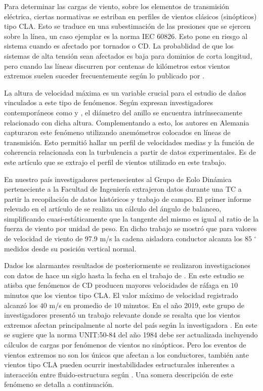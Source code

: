 Para determinar las cargas de viento, sobre los elementos de transmisión eléctrica, ciertas normativas se estriban en perfiles de vientos clásicos (sinópticos) tipo \gls{CLA}. Esto se traduce en una subestimación de las presiones que se ejercen sobre la línea, un caso ejemplar es la norma \gls{IEC} 60826. Esto pone en riesgo al sistema cuando es afectado por tornados o CD. La probablidad de que los sistemas de alta tensión sean afectados es baja para dominios de corta longitud, pero cuando las líneas discurren por centenas de kilómetros estos vientos extremos suelen suceder frecuentemente según lo publicado por \cite{ang1984probability}. 

La altura de velocidad máxima es un variable crucial para el estudio de daños vinculados a este tipo de fenómenos. Según expresan investigadores contemporáneos como \cite{holmes2002re} y \cite{abd2013coupled}, el diámetro del anillo se encuentra intrínsecamente relacionado con dicha altura. Complementando a esto, los autores \cite{stengel2017measurements} en Alemania capturaron este fenómeno utilizando anemómetros colocados en líneas de transmisión. Esto permitió hallar un perfil de velocidades medias y la función de coherencia relacionada con la turbulencia a partir de datos experimentales. Es de este artículo que se extrajo el perfil de vientos utilizado en este trabajo.

En nuestro país investigadores pertenecientes al Grupo de Eolo Dinámica perteneciente a la Facultad de Ingeniería extrajeron datos durante una TC a partir la recopilación de datos históricos y trabajo de campo. El primer informe relevado en el artículo de \cite{duranona2009analysis} se realiza un cálculo del ángulo de balanceo, simplificando cuasi-estáticamente que la tangente del mismo es igual al ratio de la fuerza de viento por unidad de peso. En dicho trabajo se mostró que para valores de velocidad de viento de 97.9 m/s la cadena aisladora conductor alcanza los $85$ $^\circ$ medidos desde su posición vertical normal.

Dados los alarmantes resultados de \cite{duranona2009analysis} posteriormente se realizaron investigaciones con datos de hace un siglo hasta la fecha en el trabajo de \cite{duranona2015significance}. En este estudio se atisba que fenómenos de CD producen mayores velocidades de ráfaga en $10$ minutos que los vientos tipo CLA. El valor máximo de velocidad registrado alcanzó los $40$ m/s en promedio de $10$ minutos. En el año 2019, este grupo de investigadores presentó un trabajo relevante donde se resalta que los vientos extremos afectan principalmente al norte del país según la investigadora \cite{duranona2019first}. En este se sugiere que la norma UNIT:50-84 del año 1984 debe ser actualizada incluyendo cálculos de cargas por fenómenos de vientos no sinópticos. Pero los eventos de vientos extremos no son los únicos que afectan a los conductores, también ante vientos tipo CLA pueden ocurrir inestabilidades estructurales inherentes a interacción entre fluido-estructura según \cite{luongo2007linear}. Una somera descripción de este fenómeno se detalla a continuación. 

